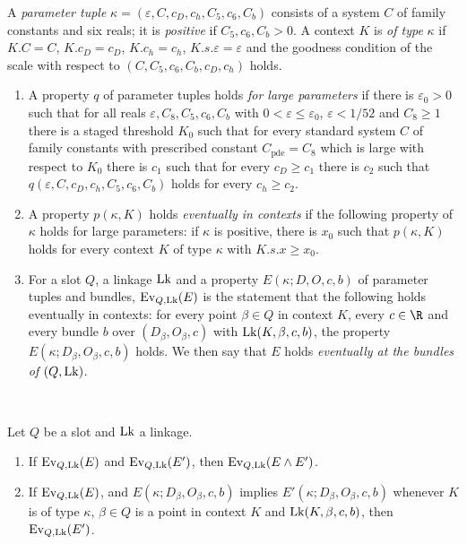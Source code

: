 \begin{definition}\label{pf:open0a:def:rowE}
A \emph{parameter tuple} $\kappa=(\varepsilon,C,c_D,c_h,C_5,c_6,C_b)$ consists of a system $C$ of family constants
and six reals; it is \emph{positive} if $C_5,c_6,C_b>0$. A context $K$ is \emph{of type} $\kappa$ if $K.C=C$,
$K.c_D=c_D$, $K.c_h=c_h$, $K.s.\varepsilon=\varepsilon$ and the goodness condition of the scale with respect to
$(C,C_5,c_6,C_b,c_D,c_h)$ holds.
\begin{enumerate}[label=(\alph*)]
\item A property $q$ of parameter tuples holds \emph{for large parameters} if there is $\varepsilon_0>0$ such that
for all reals $\varepsilon,C_8,C_5,c_6,C_b$ with $0<\varepsilon\le\varepsilon_0$, $\varepsilon<1/52$ and $C_8\ge1$
there is a staged threshold $K_0$ such that for every standard system $C$ of family constants with prescribed constant
$C_{\mathrm{pde}}=C_8$ which is large with respect to $K_0$ there is $c_1$ such that for every $c_D\ge c_1$ there is $c_2$
such that $q(\varepsilon,C,c_D,c_h,C_5,c_6,C_b)$ holds for every $c_h\ge c_2$.
\item A property $p(\kappa,K)$ holds \emph{eventually in contexts} if the following property of $\kappa$ holds for
large parameters: if $\kappa$ is positive, there is $x_0$ such that $p(\kappa,K)$ holds for every context $K$ of
type $\kappa$ with $K.s.x\ge x_0$.
\item For a slot $Q$, a linkage $\mathrm{Lk}$ and a property $E(\kappa;D,O,c,b)$ of parameter tuples and bundles,
$\mathrm{Ev}_{Q,\mathrm{Lk}}(E)$ is the statement that the following holds eventually in contexts: for every
point $\beta\in Q$ in context $K$, every $c\in\R$ and every bundle $b$ over $(D_\beta,O_\beta,c)$ with
$\mathrm{Lk}(K,\beta,c,b)$, the property $E(\kappa;D_\beta,O_\beta,c,b)$ holds. We then say that $E$ holds
\emph{eventually at the bundles of} $(Q,\mathrm{Lk})$.
\end{enumerate}
\ \ 
\end{definition}

\begin{lemma}\label{pf:open0a:rowEcalc}
Let $Q$ be a slot and $\mathrm{Lk}$ a linkage.
\begin{enumerate}[label=(\alph*)]
\item If $\mathrm{Ev}_{Q,\mathrm{Lk}}(E)$ and $\mathrm{Ev}_{Q,\mathrm{Lk}}(E')$, then
$\mathrm{Ev}_{Q,\mathrm{Lk}}(E\wedge E')$.
\item If $\mathrm{Ev}_{Q,\mathrm{Lk}}(E)$, and $E(\kappa;D_\beta,O_\beta,c,b)$ implies
$E'(\kappa;D_\beta,O_\beta,c,b)$ whenever $K$ is of type $\kappa$, $\beta\in Q$ is a point in context $K$ and
$\mathrm{Lk}(K,\beta,c,b)$, then $\mathrm{Ev}_{Q,\mathrm{Lk}}(E')$.
\end{enumerate}
\ 
\end{lemma}

